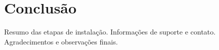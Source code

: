 \documentclass[
book,
12pt,
oneside,
a4paper,
chapter=TITLE,
english,
brazil,
sumario = tradicional,
]{abntex2}
\begin{document}
\frenchspacing


%
%


\maketitle
%



 

 



%














\chapter{Conclusão}


\appendix
{}

Resumo das etapas de instalação. Informações de suporte e contato. Agradecimentos e observações finais.
\end{document}
